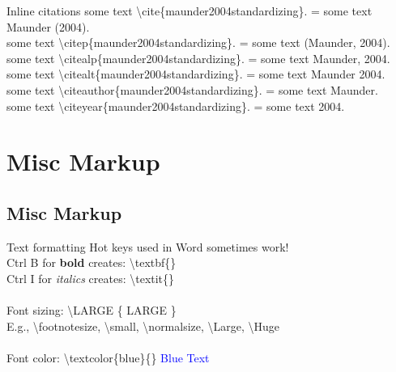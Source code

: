 \documentclass[xcolor=dvipsnames]{beamer}
\begin{document}
\begin{frame}{\LARGE{Inline citations}}
some text \textbackslash cite\{maunder2004standardizing\}. = some text Maunder (2004).\\
some text \textbackslash citep\{maunder2004standardizing\}.  = some text (Maunder, 2004).\\
some text \textbackslash citealp\{maunder2004standardizing\}.  = some text Maunder, 2004.\\
some text \textbackslash citealt\{maunder2004standardizing\}.  = some text Maunder 2004.\\
some text \textbackslash citeauthor\{maunder2004standardizing\}.  = some text Maunder.\\
some text \textbackslash citeyear\{maunder2004standardizing\}.  = some text 2004.\\

\end{frame}


\section{Misc Markup}
\subsection{Misc Markup}

\begin{frame}{\LARGE{Text formatting}}
Hot keys used in Word sometimes work!\\
Ctrl B for \textbf{bold} creates: \textbackslash textbf\{\}\\
Ctrl I for \textit{italics} creates: \textbackslash textit\{\}\\~\\

Font sizing: \textbackslash LARGE \{ \Large{LARGE} \normalsize \}\\
E.g., \textbackslash footnotesize, \textbackslash small, \textbackslash normalsize, \textbackslash Large, \textbackslash Huge \\~\\

Font color: \textbackslash textcolor\{blue\}\{\} \textcolor{blue}{Blue Text}
\end{frame}
\end{document}
